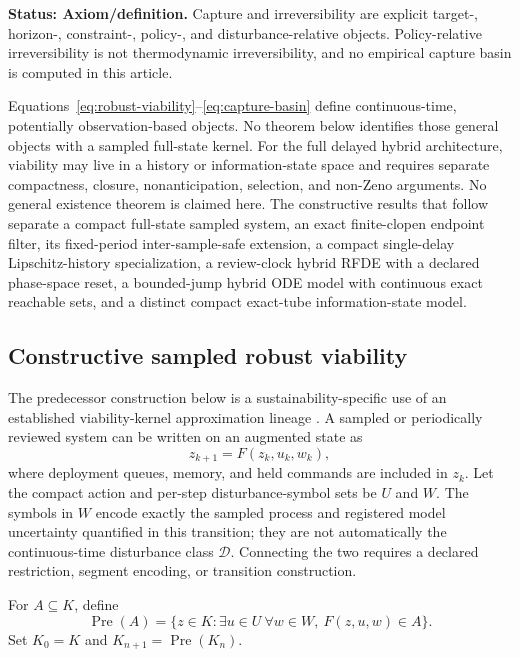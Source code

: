 \documentclass[11pt]{article}
\theoremstyle{definition}
\newcommand{\Pre}{\operatorname{Pre}}
\newcommand{\status}[1]{\par\smallskip\noindent\textbf{Status: #1.}\quad}
\begin{document}
\status{Axiom/definition} Capture and irreversibility are explicit target-, horizon-, constraint-, policy-, and disturbance-relative objects. Policy-relative irreversibility is not thermodynamic irreversibility, and no empirical capture basin is computed in this article.

Equations~\eqref{eq:robust-viability}--\eqref{eq:capture-basin} define continuous-time, potentially observation-based objects. No theorem below identifies those general objects with a sampled full-state kernel. For the full delayed hybrid architecture, viability may live in a history or information-state space and requires separate compactness, closure, nonanticipation, selection, and non-Zeno arguments. No general existence theorem is claimed here. The constructive results that follow separate a compact full-state sampled system, an exact finite-clopen endpoint filter, its fixed-period inter-sample-safe extension, a compact single-delay Lipschitz-history specialization, a review-clock hybrid RFDE with a declared phase-space reset, a bounded-jump hybrid ODE model with continuous exact reachable sets, and a distinct compact exact-tube information-state model.

\subsection{Constructive sampled robust viability}

The predecessor construction below is a sustainability-specific use of an established viability-kernel approximation lineage \cite{saintpierre1994}. A sampled or periodically reviewed system can be written on an augmented state as
\begin{equation}
z_{k+1}=F(z_k,u_k,w_k),
\label{eq:sampled-transition}
\end{equation}
where deployment queues, memory, and held commands are included in $z_k$. Let the compact action and per-step disturbance-symbol sets be $U$ and $W$. The symbols in $W$ encode exactly the sampled process and registered model uncertainty quantified in this transition; they are not automatically the continuous-time disturbance class $\mathcal D$. Connecting the two requires a declared restriction, segment encoding, or transition construction.

For $A\subseteq K$, define
\begin{equation}
\Pre(A)=\{z\in K:\exists u\in U\ \forall w\in W,
\ F(z,u,w)\in A\}.
\label{eq:predecessor}
\end{equation}
Set $K_0=K$ and $K_{n+1}=\Pre(K_n)$.
\end{document}

